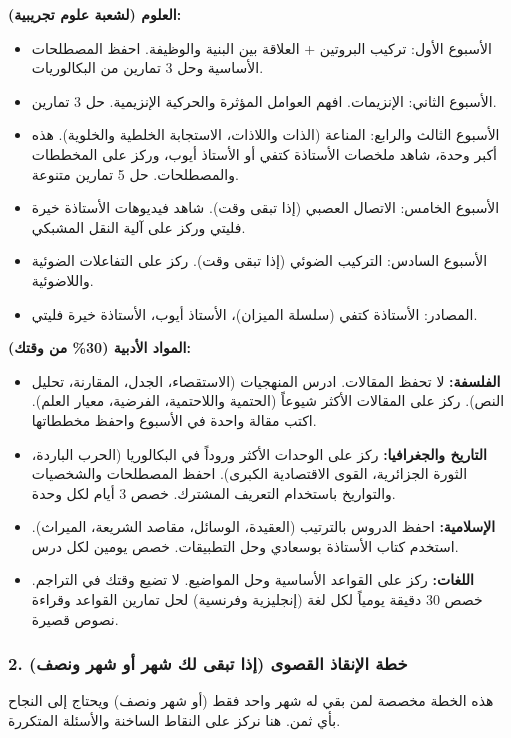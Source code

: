 \documentclass[12pt,a4paper]{book}
\begin{document}
	\textbf{العلوم (لشعبة علوم تجريبية):}
	\begin{itemize}
		\item الأسبوع الأول: تركيب البروتين + العلاقة بين البنية والوظيفة. احفظ المصطلحات الأساسية  وحل 3 تمارين من البكالوريات.
		\item الأسبوع الثاني: الإنزيمات. افهم العوامل المؤثرة والحركية الإنزيمية. حل 3 تمارين.
		\item الأسبوع الثالث والرابع: المناعة (الذات واللاذات، الاستجابة الخلطية والخلوية). هذه أكبر وحدة، شاهد ملخصات الأستاذة كتفي أو الأستاذ أيوب، وركز على المخططات والمصطلحات. حل 5 تمارين متنوعة.
		\item الأسبوع الخامس: الاتصال العصبي (إذا تبقى وقت). شاهد فيديوهات الأستاذة خيرة فليتي وركز على آلية النقل المشبكي.
		\item الأسبوع السادس: التركيب الضوئي (إذا تبقى وقت). ركز على التفاعلات الضوئية واللاضوئية.
		\item المصادر: الأستاذة كتفي (سلسلة الميزان)، الأستاذ أيوب، الأستاذة خيرة فليتي.
	\end{itemize}
	
	\textbf{المواد الأدبية (30\% من وقتك):}
	\begin{itemize}
		\item \textbf{الفلسفة:} لا تحفظ المقالات. ادرس المنهجيات (الاستقصاء، الجدل، المقارنة، تحليل النص). ركز على المقالات الأكثر شيوعاً (الحتمية واللاحتمية، الفرضية، معيار العلم). اكتب مقالة واحدة في الأسبوع واحفظ مخططاتها.
		\item \textbf{التاريخ والجغرافيا:} ركز على الوحدات الأكثر وروداً في البكالوريا (الحرب الباردة، الثورة الجزائرية، القوى الاقتصادية الكبرى). احفظ المصطلحات والشخصيات والتواريخ باستخدام التعريف المشترك. خصص 3 أيام لكل وحدة.
		\item \textbf{الإسلامية:} احفظ الدروس بالترتيب (العقيدة، الوسائل، مقاصد الشريعة، الميراث). استخدم كتاب الأستاذة بوسعادي وحل التطبيقات. خصص يومين لكل درس.
		\item \textbf{اللغات:} ركز على القواعد الأساسية وحل المواضيع. لا تضيع وقتك في التراجم. خصص 30 دقيقة يومياً لكل لغة (إنجليزية وفرنسية) لحل تمارين القواعد وقراءة نصوص قصيرة.
	\end{itemize}
	
	\subsubsection*{2. خطة الإنقاذ القصوى (إذا تبقى لك شهر أو شهر ونصف)}
	     \label{sec:psy-late-start-success2}
	هذه الخطة مخصصة لمن بقي له شهر واحد فقط (أو شهر ونصف) ويحتاج إلى النجاح بأي ثمن. هنا نركز على النقاط الساخنة والأسئلة المتكررة.
	
\end{document}
